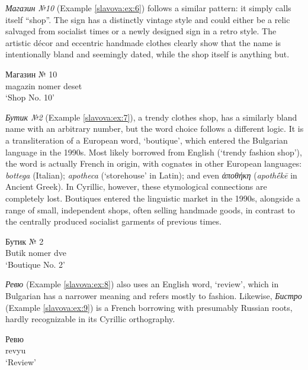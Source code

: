 \documentclass[output=paper]{langscibook}
\begin{document}
\textit{Магазин №10} (Example \ref{slavova:ex:6}) follows a similar pattern: it simply calls itself “shop”. The sign has a distinctly vintage style and could either be a relic salvaged from socialist times or a newly designed sign in a retro style. The artistic décor and eccentric handmade clothes clearly show that the name is intentionally bland and seemingly dated, while the shop itself is anything but.

\begin{exe}
  \ex\label{slavova:ex:6}
  \gll Магазин № 10 \\
  magazin nomer deset \\
  \glt ‘Shop No. 10’
\end{exe}

\noindent
\textit{Бутик №2} (Example \ref{slavova:ex:7}), a trendy clothes shop, has a similarly bland name with an arbitrary number, but the word choice follows a different logic. It is a transliteration of a European word, ‘boutique’, which entered the Bulgarian language in the 1990s. Most likely borrowed from English (‘trendy fashion shop’), the word is actually French in origin, with cognates in other European languages: \textit{bottega} (Italian); \textit{apotheca} (‘storehouse’ in Latin); and even \textit{ἀποθήκη} (\textit{apothḗkē} in Ancient Greek). In Cyrillic, however, these etymological connections are completely lost. Boutiques entered the linguistic market in the 1990s, alongside a range of small, independent shops, often selling handmade goods, in contrast to the centrally produced socialist garments of previous times.

\begin{exe}
  \ex\label{slavova:ex:7}
  \gll Бутик № 2 \\
  Butik nomer dve \\
  \glt ‘Boutique No. 2’
\end{exe}

\noindent
\textit{Ревю} (Example \ref{slavova:ex:8}) also uses an English word, ‘review’, which in Bulgarian has a narrower meaning and refers mostly to fashion. Likewise, \textit{Бистро} (Example \ref{slavova:ex:9}) is a French borrowing with presumably Russian roots, hardly recognizable in its Cyrillic orthography.

\begin{exe}
  \ex\label{slavova:ex:8}
  \gll Ревю \\
  revyu \\
  \glt ‘Review’
\end{exe}
\end{document}
